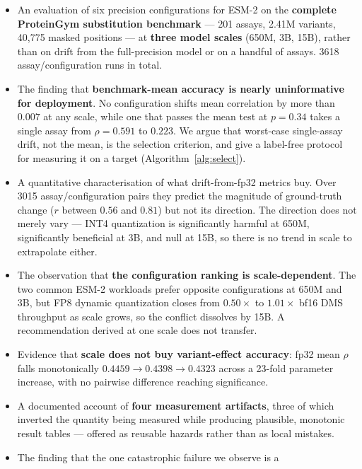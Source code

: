 \documentclass[11pt]{article}
\begin{document}
\begin{itemize}\setlength{\itemsep}{2pt}
  \item An evaluation of six precision configurations for ESM-2 on the
        \textbf{complete ProteinGym substitution benchmark} --- 201 assays,
        2.41M variants, 40{,}775 masked positions --- at \textbf{three model
        scales} (650M, 3B, 15B), rather than on drift from the full-precision
        model or on a handful of assays. 3618 assay/configuration runs in total.
  \item The finding that \textbf{benchmark-mean accuracy is nearly uninformative
        for deployment}. No configuration shifts mean correlation by more than
        $0.007$ at any scale, while one that passes the mean test at $p = 0.34$
        takes a single assay from $\rho = 0.591$ to $0.223$. We argue that
        worst-case single-assay drift, not the mean, is the selection criterion,
        and give a label-free protocol for measuring it on a target
        (Algorithm~\ref{alg:select}).
  \item A quantitative characterisation of what drift-from-fp32 metrics buy.
        Over 3015 assay/configuration pairs they predict the magnitude of
        ground-truth change ($r$ between $0.56$ and $0.81$) but not its
        direction. The
        direction does not merely vary --- INT4 quantization is significantly
        harmful at 650M, significantly beneficial at 3B, and null at 15B, so
        there is no trend in scale to extrapolate either.
  \item The observation that \textbf{the configuration ranking is
        scale-dependent}. The two common ESM-2 workloads prefer opposite
        configurations at 650M and 3B, but FP8 dynamic quantization closes from
        $0.50\times$ to $1.01\times$ bf16 DMS throughput as scale grows, so the
        conflict dissolves by 15B. A recommendation derived at one scale does
        not transfer.
  \item Evidence that \textbf{scale does not buy variant-effect accuracy}:
        fp32 mean $\rho$ falls monotonically $0.4459 \to 0.4398 \to 0.4323$
        across a 23-fold parameter increase, with no pairwise difference
        reaching significance.
  \item A documented account of \textbf{four measurement artifacts}, three of
        which inverted the quantity being measured while producing plausible,
        monotonic result tables --- offered as reusable hazards rather than as
        local mistakes.
  \item The finding that the one catastrophic failure we observe is a

\end{itemize}
\end{document}
